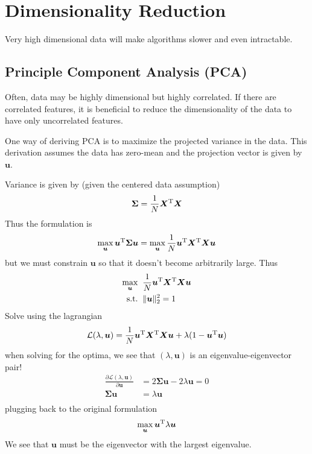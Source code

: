 \documentclass[11pt]{article}
\newcommand{\vct}[1]{\boldsymbol{#1}} %
\newcommand{\mat}[1]{\boldsymbol{#1}} %
\newcommand{\T}{^{\textrm T}} %
\begin{document}
\section{Dimensionality Reduction}
Very high dimensional data will make algorithms slower and even intractable.

\subsection{Principle Component Analysis (PCA)}
Often, data may be highly dimensional but highly correlated. If there are correlated features, it is beneficial to reduce the dimensionality of the data to have only uncorrelated features.

One way of deriving PCA is to maximize the projected variance in the data. This derivation assumes the data has zero-mean and the projection vector is given by $\vct{u}$.

Variance is given by (given the centered data assumption)
\begin{align*}
\mat{\Sigma} = \frac{1}{N} \mat{X}\T\mat{X}
\end{align*}
Thus the formulation is
\begin{align*}
\max_{\vct{u}} \vct{u}\T\mat{\Sigma}\vct{u} = \max_{\vct{u}} \frac{1}{N} \vct{u}\T\mat{X}\T\mat{X}\vct{u}
\end{align*}
but we must constrain $\vct{u}$ so that it doesn't become arbitrarily large. Thus
\begin{align*}
\max_{\vct{u}} \;\;&\frac{1}{N} \vct{u}\T\mat{X}\T\mat{X}\vct{u}\\
\text{s.t.}\;\;& \|\vct{u}\|_2^2 = 1
\end{align*}
Solve using the lagrangian
\begin{align*}
\mathcal{L}(\lambda,\vct{u}) = \frac{1}{N} \vct{u}\T\mat{X}\T\mat{X}\vct{u} + \lambda(1 - \vct{u}\T\vct{u})
\end{align*}
when solving for the optima, we see that $(\lambda,\vct{u})$ is an eigenvalue-eigenvector pair!
\begin{align*}
\frac{\partial \mathcal{L}(\lambda,\vct{u})}{\partial \vct{u}} &= 2\mat{\Sigma}\vct{u} - 2\lambda\vct{u} = 0\\
\mat{\Sigma}\vct{u} &= \lambda\vct{u}\\
\end{align*}
plugging back to the original formulation
\begin{align*}
\max_{\vct{u}} \vct{u}\T\lambda\vct{u}
\end{align*}
We see that $\vct{u}$ must be the eigenvector with the largest eigenvalue.
\end{document}
